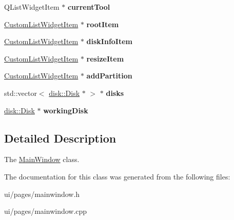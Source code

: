 \begin{DoxyCompactItemize}
\item 
\mbox{\label{class_main_window_ab97c3f788b735ad05d4f4f54e1f56775}} 
Q\+List\+Widget\+Item $\ast$ {\bfseries current\+Tool}
\item 
\mbox{\label{class_main_window_a7cf33185547b63281d9c361fdd623452}} 
\mbox{\hyperlink{class_custom_list_widget_item}{Custom\+List\+Widget\+Item}} $\ast$ {\bfseries root\+Item}
\item 
\mbox{\label{class_main_window_a8340e48a56e82f7ed6be1a00b75cfbf5}} 
\mbox{\hyperlink{class_custom_list_widget_item}{Custom\+List\+Widget\+Item}} $\ast$ {\bfseries disk\+Info\+Item}
\item 
\mbox{\label{class_main_window_a2edc4e1cc13b43c5b8cd3bfacfbfbbbd}} 
\mbox{\hyperlink{class_custom_list_widget_item}{Custom\+List\+Widget\+Item}} $\ast$ {\bfseries resize\+Item}
\item 
\mbox{\label{class_main_window_a74ec18d9a8b2a967bbc915edc7335526}} 
\mbox{\hyperlink{class_custom_list_widget_item}{Custom\+List\+Widget\+Item}} $\ast$ {\bfseries add\+Partition}
\item 
\mbox{\label{class_main_window_ac3e039dffec105d885b6cf46993e0362}} 
std\+::vector$<$ \mbox{\hyperlink{classdisk_1_1_disk}{disk\+::\+Disk}} $\ast$ $>$ $\ast$ {\bfseries disks}
\item 
\mbox{\label{class_main_window_a98c92e90caf2a0312d38fcf3608acd47}} 
\mbox{\hyperlink{classdisk_1_1_disk}{disk\+::\+Disk}} $\ast$ {\bfseries working\+Disk}
\end{DoxyCompactItemize}


\subsection{Detailed Description}
The \mbox{\hyperlink{class_main_window}{Main\+Window}} class. 

The documentation for this class was generated from the following files\+:\begin{DoxyCompactItemize}
\item 
ui/pages/mainwindow.\+h\item 
ui/pages/mainwindow.\+cpp\end{DoxyCompactItemize}
